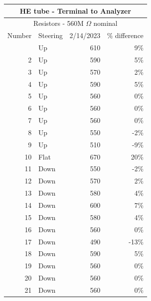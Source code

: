 \documentclass{scrartcl}
\begin{document}
\centering
	\begin{longtable}{|r|l|r|r|}
		\hline
		\multicolumn{4}{|c|}{\Large HE tube - Terminal to Analyzer} \\
		\hline
		\multicolumn{4}{|c|}{Resistors - 560M $\Omega$ nominal} \\
		\hline
	  	\multicolumn{1}{|l|}{Number} & Steering & 2/14/2023 & \multicolumn{1}{l|}{\% difference}   \\
		\hline
	  	\endhead
		\hline
		\endfoot
	  	1     & Up    & 610   & \cellcolor[rgb]{ 1,  .922,  .612}\textcolor[rgb]{ .612,  .341,  0}{9\%}   \\
	  	2     & Up    & 590   & \cellcolor[rgb]{ 1,  .922,  .612}\textcolor[rgb]{ .612,  .341,  0}{5\%}   \\
		3     & Up    & 570   & 2\%    \\
		4     & Up    & 590   & \cellcolor[rgb]{ 1,  .922,  .612}\textcolor[rgb]{ .612,  .341,  0}{5\%}   \\
		5     & Up    & 560   & 0\%    \\
		6     & Up    & 560   & 0\%     \\
		7     & Up    & 560   & 0\%     \\
		8     & Up    & 550   & -2\%    \\
		9     & Up    & 510   & \cellcolor[rgb]{ 1,  .922,  .612}\textcolor[rgb]{ .612,  .341,  0}{-9\%}   \\
		10    & Flat  & 670   & \cellcolor[rgb]{ 1,  .78,  .808}\textcolor[rgb]{ .612,  0,  .024}{20\%}  \\
		11    & Down  & 550   & -2\%    \\
		12    & Down  & 570   & 2\%     \\
		13    & Down  & 580   & 4\%     \\
		14    & Down  & 600   & \cellcolor[rgb]{ 1,  .922,  .612}\textcolor[rgb]{ .612,  .341,  0}{7\%}   \\
		15    & Down  & 580   & 4\%    \\
		16    & Down  & 560   & 0\%     \\
		17    & Down  & 490   & \cellcolor[rgb]{ 1,  .78,  .808}\textcolor[rgb]{ .612,  0,  .024}{-13\%}   \\
		18    & Down  & 590   & \cellcolor[rgb]{ 1,  .922,  .612}\textcolor[rgb]{ .612,  .341,  0}{5\%}   \\
		19    & Down  & 560   & 0\%     \\
		20    & Down  & 560   & 0\%     \\
		21    & Down  & 560   & 0\%     \\

\end{longtable}
\end{document}
